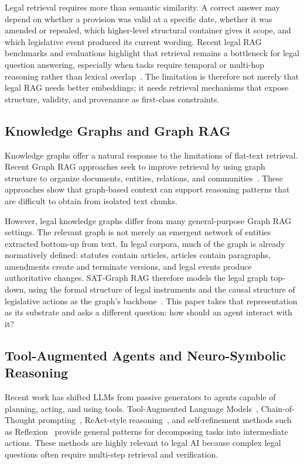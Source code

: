 \documentclass[11pt]{article}
\begin{document}
Legal retrieval requires more than semantic similarity. A correct answer may depend on whether a provision was valid at a specific date, whether it was amended or repealed, which higher-level structural container gives it scope, and which legislative event produced its current wording. Recent legal RAG benchmarks and evaluations highlight that retrieval remains a bottleneck for legal question answering, especially when tasks require temporal or multi-hop reasoning rather than lexical overlap~\cite{pipitone2024legalbench,zheng2025reasoning}. The limitation is therefore not merely that legal RAG needs better embeddings; it needs retrieval mechanisms that expose structure, validity, and provenance as first-class constraints.

\subsection{Knowledge Graphs and Graph RAG}

Knowledge graphs offer a natural response to the limitations of flat-text retrieval. Recent Graph RAG approaches seek to improve retrieval by using graph structure to organize documents, entities, relations, and communities~\cite{pan2024unifying,edge2024graphrag}. These approaches show that graph-based context can support reasoning patterns that are difficult to obtain from isolated text chunks.

However, legal knowledge graphs differ from many general-purpose Graph RAG settings. The relevant graph is not merely an emergent network of entities extracted bottom-up from text. In legal corpora, much of the graph is already normatively defined: statutes contain articles, articles contain paragraphs, amendments create and terminate versions, and legal events produce authoritative changes. SAT-Graph RAG therefore models the legal graph top-down, using the formal structure of legal instruments and the causal structure of legislative actions as the graph's backbone~\cite{demartim2025graphrag}. This paper takes that representation as its substrate and asks a different question: how should an agent interact with it?

\subsection{Tool-Augmented Agents and Neuro-Symbolic Reasoning}

Recent work has shifted LLMs from passive generators to agents capable of planning, acting, and using tools. Tool-Augmented Language Models~\cite{parisi2022talm,schick2023toolformer}, Chain-of-Thought prompting~\cite{wei2022chain}, ReAct-style reasoning~\cite{yao2023react}, and self-refinement methods such as Reflexion~\cite{shinn2023reflexion} provide general patterns for decomposing tasks into intermediate actions. These methods are highly relevant to legal AI because complex legal questions often require multi-step retrieval and verification.
\end{document}
